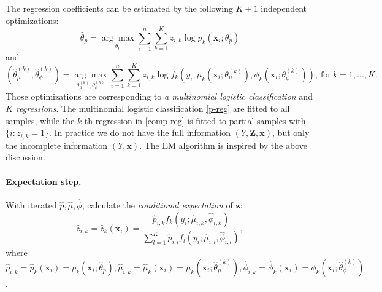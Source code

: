 \documentclass[11pt]{article}
\numberwithin{equation}{section}
\def\bx{\boldsymbol{x}}
\def\bZ{\boldsymbol{Z}}
\def\bz{\boldsymbol{z}}
\begin{document}
	 The regression coefficients can be estimated by the following $K+1$ {independent optimizations:}
	\begin{equation}\label{p-reg}
		\hat{\theta}_p=\underset{\theta_p}{\arg\max}\sum_{i=1}^n\sum_{k=1}^Kz_{i,k}\log p_k(\bx_i;\theta_p)
	\end{equation}
and
	\begin{equation}\label{comp-reg}
		\left(\hat{\theta}_\mu^{(k)},\hat{\theta}_\phi^{(k)}\right)=\underset{\theta^{(k)}_\mu,\theta^{(k)}_\phi}{\arg\max}\sum_{i=1}^n\sum_{k=1}^Kz_{i,k}\log f_k\left(y_i;\mu_k\left(\bx_i;\theta_\mu^{(k)}\right),\phi_k\left(\bx_i;\theta_\phi^{(k)}\right)\right), ~\text{for} ~ k=1,\ldots,K.
	\end{equation}
	Those optimizations are corresponding to  {\it a multinomial logistic classification} and {\it $K$ regressions}.
The multinomial logistic classification \eqref{p-reg} are fitted to all samples, while the $k$-th regression in \eqref{comp-reg} is fitted to {partial} samples with $\{i:z_{i,k}=1\}$.
In practice we do not have the full information  $(Y,\bZ,\bx)$, but only the incomplete information $(Y,\bx)$. The EM algorithm is inspired by the above discussion.
\paragraph{Expectation step.}
	With iterated $\hat{p},\hat{\mu},\hat{\phi}$, calculate the \textit{conditional expectation} of $\bz$:
	$$\hat{z}_{i,k}=\hat{z}_k(\bx_i)=\frac{\hat{p}_{i,k}f_k(y_i;\hat{\mu}_{i,k},\hat{\phi}_{i,k})}{\sum_{l=1}^K\hat{p}_{i,l}f_l(y_i;\hat{\mu}_{i,l},\hat{\phi}_{i,l})},$$
	where
	$\hat{p}_{i,k}=\hat{p}_k(\bx_i)= p_k(\bx_i;\hat{\theta}_p),\hat{\mu}_{i,k}=\hat{\mu}_k(\bx_i)=\mu_k\left(\bx_i;\hat{\theta}_\mu^{(k)}\right),\hat{\phi}_{i,k}=\hat{\phi}_k(\bx_i)=\phi_k\left(\bx_i;\hat{\theta}_\phi^{(k)}\right)$.
\end{document}
